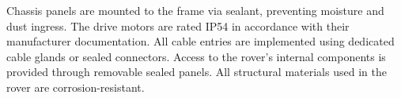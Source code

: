 

Chassis panels are mounted to the frame via sealant, preventing moisture and dust ingress. The drive motors are rated IP54 in accordance with their manufacturer documentation. All cable entries are implemented using dedicated cable glands or sealed connectors. Access to the rover's internal components is provided through removable sealed panels. All structural materials used in the rover are corrosion-resistant.